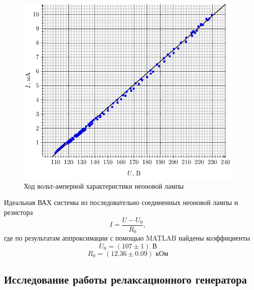 

\newpage


\begin{figure}[H]
	\centering
	\includegraphics[width=\textwidth]{vax}
	\caption{Ход вольт-амперной характеристики неоновой лампы}
	\label{fig:figure1}
\end{figure}

Идеальная ВАХ системы из последовательно соединенных неоновой лампы и резистора
\begin{equation}
	I=\frac{U-U_0}{R_0},
\end{equation}
где по результатам аппроксимации с помощью MATLAB найдены коэффициенты 
\begin{equation}
	U_0=(107\pm1) \text{ В}
\end{equation}
\begin{equation}
	R_0=(12.36\pm0.09) \text{ кОм}
\end{equation}

\newpage
\subsection{Исследование работы релаксационного генератора}

